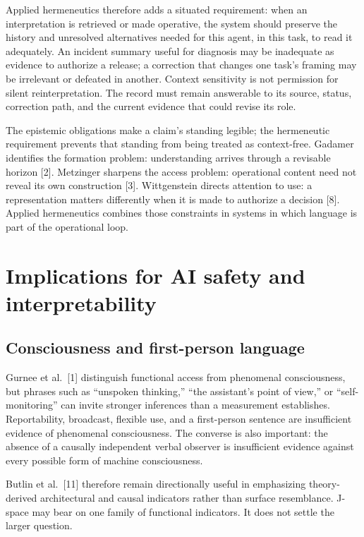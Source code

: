 \documentclass[12pt]{article}
\begin{document}
Applied hermeneutics therefore adds a situated requirement: when an interpretation is retrieved or made operative, the system should preserve the history and unresolved alternatives needed for this agent, in this task, to read it adequately. An incident summary useful for diagnosis may be inadequate as evidence to authorize a release; a correction that changes one task's framing may be irrelevant or defeated in another. Context sensitivity is not permission for silent reinterpretation. The record must remain answerable to its source, status, correction path, and the current evidence that could revise its role.

The epistemic obligations make a claim's standing legible; the hermeneutic requirement prevents that standing from being treated as context-free. Gadamer identifies the formation problem: understanding arrives through a revisable horizon {[}2{]}. Metzinger sharpens the access problem: operational content need not reveal its own construction {[}3{]}. Wittgenstein directs attention to use: a representation matters differently when it is made to authorize a decision {[}8{]}. Applied hermeneutics combines those constraints in systems in which language is part of the operational loop.

\section{Implications for AI safety and interpretability}\label{implications-for-ai-safety-and-interpretability}

\subsection{Consciousness and first-person language}\label{consciousness-and-first-person-language}

Gurnee et al.~{[}1{]} distinguish functional access from phenomenal consciousness, but phrases such as ``unspoken thinking,'' ``the assistant's point of view,'' or ``self-monitoring'' can invite stronger inferences than a measurement establishes. Reportability, broadcast, flexible use, and a first-person sentence are insufficient evidence of phenomenal consciousness. The converse is also important: the absence of a causally independent verbal observer is insufficient evidence against every possible form of machine consciousness.

Butlin et al.~{[}11{]} therefore remain directionally useful in emphasizing theory-derived architectural and causal indicators rather than surface resemblance. J-space may bear on one family of functional indicators. It does not settle the larger question.
\end{document}
